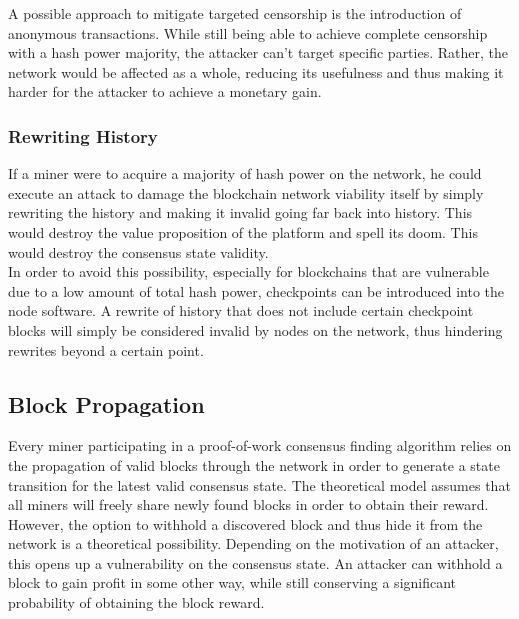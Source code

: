\documentclass[12pt,a4paper]{article}
\begin{document}
A possible approach to mitigate targeted censorship is the introduction of anonymous transactions. While still being able to achieve complete censorship with a hash power majority, the attacker can't target specific parties. Rather, the network would be affected as a whole, reducing its usefulness and thus making it harder for the attacker to achieve a monetary gain.\\

\subsubsection{Rewriting History}

If a miner were to acquire a majority of hash power on the network, he could execute an attack to damage the blockchain network viability itself by simply rewriting the history and making it invalid going far back into history. This would destroy the value proposition of the platform and spell its doom. This would destroy the consensus state validity.\\

In order to avoid this possibility, especially for blockchains that are vulnerable due to a low amount of total hash power, checkpoints can be introduced into the node software. A rewrite of history that does not include certain checkpoint blocks will simply be considered invalid by nodes on the network, thus hindering rewrites beyond a certain point.\\

\subsection{Block Propagation}

Every miner participating in a proof-of-work consensus finding algorithm relies on the propagation of valid blocks through the network in order to generate a state transition for the latest valid consensus state. The theoretical model assumes that all miners will freely share newly found blocks in order to obtain their reward.\\

However, the option to withhold a discovered block and thus hide it from the network is a theoretical possibility. Depending on the motivation of an attacker, this opens up a vulnerability on the consensus state. An attacker can withhold a block to gain profit in some other way, while still conserving a significant probability of obtaining the block reward.\\
\end{document}
